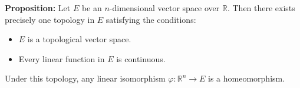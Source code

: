 \textbf{Proposition:} Let $E$ be an $n$-dimensional vector space over $\mathbb{R}$. Then there exists precisely one topology in $E$ satisfying the conditions:
\begin{itemize}
\item[T$_1$:] $E$ is a topological vector space.
\item[T$_2$:] Every linear function in $E$ is continuous.
\end{itemize}
Under this topology, any linear isomorphism $\varphi: \mathbb{R}^n \to E$ is a homeomorphism.
